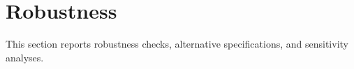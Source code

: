 \section{Robustness} \label{sec:robustness}

This section reports robustness checks, alternative specifications, and sensitivity analyses.
